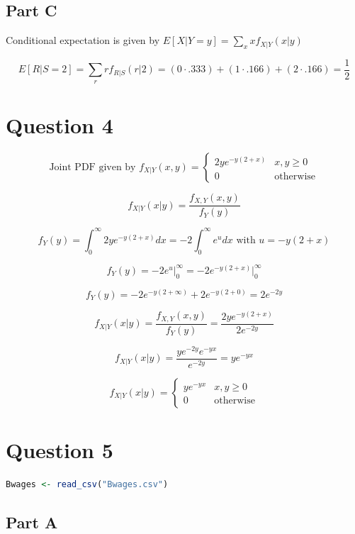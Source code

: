 \documentclass[letterpaper]{article}
\begin{document}
\subsection*{Part C}

Conditional expectation is given by $E[X | Y=y] = \sum_{x} x f_{X | Y}(x | y)$

$$E[R|S=2] = \sum_{r} r f_{R | S}(r | 2) = (0 \cdot .333) + (1 \cdot .166) + (2 \cdot .166) = \frac{1}{2}$$

\newpage

\section*{Question 4}

$$\text{Joint PDF given by } f_{X|Y}(x, y) = \begin{cases} 2ye^{-y(2+x)} & x, y \geq 0 \\ 0  & \text{otherwise} \end{cases}$$

$$f_{X|Y}(x|y) = \frac{f_{X,Y}(x, y)}{f_Y(y)}$$

$$f_Y(y) = \int_0^{\infty} 2ye^{-y(2+x)} dx = -2 \int_0^{\infty} e^u dx \text{ with } u = -y(2+x)$$

$$f_Y(y) = -2 e^u \Big|_0^{\infty} = -2 e^{-y(2+x)} \Big|_0^{\infty}$$

$$f_Y(y) = -2 e^{-y(2+ \infty)} + 2 e^{-y(2+0)} = 2 e^{-2y}$$

$$f_{X|Y}(x|y) = \frac{f_{X,Y}(x, y)}{f_Y(y)} = \frac{2ye^{-y(2+x)}}{2 e^{-2y}}$$

$$f_{X|Y}(x|y) = \frac{y e^{-2y} e^{-yx}}{e^{-2y}} = y e^{-yx}$$

$$f_{X|Y}(x|y) = \begin{cases} y e^{-yx} & x, y \geq 0 \\ 0 & \text{otherwise} \end{cases}$$

\newpage

\section*{Question 5}

\begin{lstlisting}[language=R]
    Bwages <- read_csv("Bwages.csv")
\end{lstlisting}

\subsection*{Part A}
\end{document}

